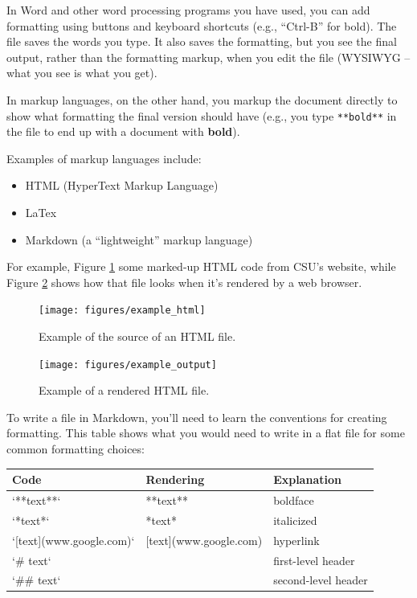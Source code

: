 \documentclass[]{book}
\providecommand{\tightlist}{%
  \setlength{\itemsep}{0pt}\setlength{\parskip}{0pt}}
\theoremstyle{definition}
\theoremstyle{definition}
\theoremstyle{definition}
\theoremstyle{remark}
\begin{document}
In Word and other word processing programs you have used, you can add
formatting using buttons and keyboard shortcuts (e.g., ``Ctrl-B'' for
bold). The file saves the words you type. It also saves the formatting,
but you see the final output, rather than the formatting markup, when
you edit the file (WYSIWYG -- what you see is what you get).

In markup languages, on the other hand, you markup the document directly
to show what formatting the final version should have (e.g., you type
\texttt{**bold**} in the file to end up with a document with
\textbf{bold}).

Examples of markup languages include:

\begin{itemize}
\tightlist
\item
  HTML (HyperText Markup Language)
\item
  LaTex
\item
  Markdown (a ``lightweight'' markup language)
\end{itemize}

For example, Figure \ref{fig:htmlexample} some marked-up HTML code from
CSU's website, while Figure \ref{fig:renderedexample} shows how that
file looks when it's rendered by a web browser.

\begin{figure}

{\centering \texttt{[image: figures/example\_html]} 

}

\caption{Example of the source of an HTML file.}\label{fig:htmlexample}
\end{figure}

\begin{figure}

{\centering \texttt{[image: figures/example\_output]} 

}

\caption{Example of a rendered HTML file.}\label{fig:renderedexample}
\end{figure}

To write a file in Markdown, you'll need to learn the conventions for
creating formatting. This table shows what you would need to write in a
flat file for some common formatting choices:

\begin{tabular}{l|l|l}
\hline
Code & Rendering & Explanation\\
\hline
`**text**` & **text** & boldface\\
\hline
`*text*` & *text* & italicized\\
\hline
`[text](www.google.com)` & [text](www.google.com) & hyperlink\\
\hline
`\# text` &  & first-level header\\
\hline
`\#\# text` &  & second-level header\\
\hline
\end{tabular}
\end{document}
